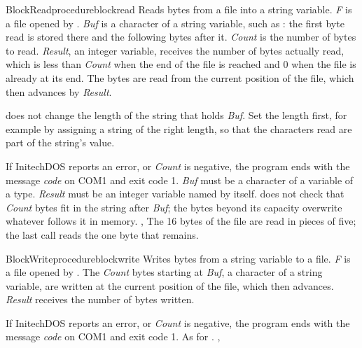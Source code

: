 \begin{LibEntry}{BlockRead}{procedure}{blockread}
\LFunction Reads bytes from a file into a string variable.
\LDeclaration {}
\LRemarks \textit{F} is a file opened by .  \textit{Buf} is
a character of a string variable, such as : the first byte read
is stored there and the following bytes after it.  \textit{Count} is the
number of bytes to read.  \textit{Result}, an integer variable, receives the
number of bytes actually read, which is less than \textit{Count} when the
end of the file is reached and 0 when the file is already at its end.
The bytes are read from the current position of the file, which then
advances by \textit{Result}.

 does not change the length of the string that
holds \textit{Buf}.  Set the length first, for example by assigning a string
of the right length, so that the characters read are part of the string's
value.

If InitechDOS reports an error, or \textit{Count} is negative, the program
ends with the message \textit{code} on COM1 and exit
code 1.
\LRestrictions \textit{Buf} must be a character of a variable of a
 type.  \textit{Result} must be an integer variable named by itself.
\LArrow{} does not check that \textit{Count} bytes fit
in the string after \textit{Buf}; the bytes beyond its capacity overwrite
whatever follows it in memory.
\LSeeAlso {}, 
\LExample
{}
The 16 bytes of the file are read in pieces of five; the last call reads
the one byte that remains.
\end{LibEntry}

\begin{LibEntry}{BlockWrite}{procedure}{blockwrite}
\LFunction Writes bytes from a string variable to a file.
\LDeclaration {}
\LRemarks \textit{F} is a file opened by .  The
\textit{Count} bytes starting at \textit{Buf}, a character of a string
variable, are written at the current position of the file, which then
advances.  \textit{Result} receives the number of bytes written.

If InitechDOS reports an error, or \textit{Count} is negative, the program
ends with the message \textit{code} on COM1 and exit
code 1.
\LRestrictions As for .
\LSeeAlso {}, 
\LExample
{}
\end{LibEntry}

